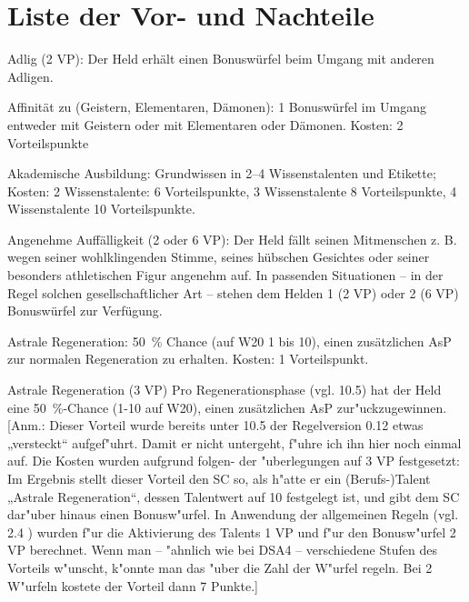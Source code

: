 \BN
\chapter{Liste der Vor- und Nachteile} \label{Ch:VorNachteile}  
\begin{description}
\item{Adlig (2 VP):} Der Held erhält einen Bonuswürfel beim Umgang mit anderen Adligen.

\item{Affinität zu (Geistern, Elementaren, Dämonen):} 1 Bonuswürfel im Umgang entweder mit Geistern oder mit Elementaren oder Dämonen. Kosten: 2 Vorteilspunkte

\item{Akademische Ausbildung:} Grundwissen in 2–4 Wissenstalenten und Etikette; Kosten: 2 Wissenstalente: 6 Vorteilspunkte, 3 Wissenstalente 8 Vorteilspunkte, 4 Wissenstalente 10 Vorteilspunkte.

\item{Angenehme Auffälligkeit (2 oder 6 VP):} Der Held fällt seinen Mitmenschen z. B. wegen seiner wohlklingenden Stimme, seines hübschen Gesichtes oder seiner besonders athletischen Figur angenehm auf. In passenden Situationen – in der Regel solchen gesellschaftlicher Art – stehen dem Helden 1 (2 VP) oder 2 (6 VP) Bonuswürfel zur Verfügung.

\item{Astrale Regeneration:} 50~\% Chance (auf W20 1 bis 10), einen zusätzlichen AsP zur normalen Regeneration zu erhalten. Kosten: 1 Vorteilspunkt.

\item{Astrale Regeneration (3 VP)}
Pro Regenerationsphase (vgl. 10.5) hat der Held eine 50~\%-Chance (1-10 auf W20), einen zusätzlichen AsP zur"uckzugewinnen. [Anm.: Dieser Vorteil wurde bereits unter 10.5 der Regelversion 0.12 etwas „versteckt“ aufgef"uhrt. Damit er nicht untergeht, f"uhre ich ihn hier noch einmal auf. Die Kosten wurden aufgrund folgen- der "uberlegungen auf 3 VP festgesetzt: Im Ergebnis stellt dieser Vorteil den SC so, als h"atte er ein (Berufs-)Talent „Astrale Regeneration“, dessen Talentwert auf 10 festgelegt ist, und gibt dem SC dar"uber hinaus einen Bonusw"urfel. In Anwendung der allgemeinen Regeln (vgl. 2.4 ) wurden f"ur die Aktivierung des Talents 1 VP und f"ur den Bonusw"urfel 2 VP berechnet. Wenn man – "ahnlich wie bei DSA4 – verschiedene Stufen des Vorteils w"unscht, k"onnte man das "uber die Zahl der W"urfel regeln. Bei 2 W"urfeln kostete der Vorteil dann 7 Punkte.]


\end{description}
